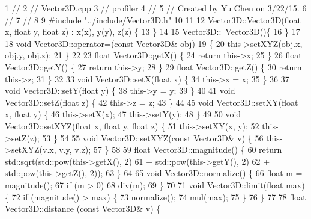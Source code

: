\begin{DoxyCodeInclude}
1 \textcolor{comment}{//}
2 \textcolor{comment}{//  Vector3D.cpp}
3 \textcolor{comment}{//  profiler}
4 \textcolor{comment}{//}
5 \textcolor{comment}{//  Created by Yu Chen on 3/22/15.}
6 \textcolor{comment}{//}
7 \textcolor{comment}{//}
8 
9 \textcolor{preprocessor}{#include "../include/Vector3D.h"}
10 
11 
12 Vector3D::Vector3D(\textcolor{keywordtype}{float} x, \textcolor{keywordtype}{float} y, \textcolor{keywordtype}{float} z) : x(x), y(y), z(z) \{
13 \}
14 
15 Vector3D::~Vector3D()\{
16 \}
17 
18 \textcolor{keywordtype}{void} Vector3D::operator=(\textcolor{keyword}{const} Vector3D& obj)
19 \{
20     this->setXYZ(obj.x, obj.y, obj.z);
21 \}
22 
23 \textcolor{keywordtype}{float} Vector3D::getX() \{
24     \textcolor{keywordflow}{return} this->x;
25 \}
26 \textcolor{keywordtype}{float} Vector3D::getY() \{
27     \textcolor{keywordflow}{return} this->y;
28 \}
29 \textcolor{keywordtype}{float} Vector3D::getZ() \{
30     \textcolor{keywordflow}{return} this->z;
31 \}
32 
33 \textcolor{keywordtype}{void} Vector3D::setX(\textcolor{keywordtype}{float} x) \{
34     this->x = x;
35 \}
36 
37 \textcolor{keywordtype}{void} Vector3D::setY(\textcolor{keywordtype}{float} y) \{
38     this->y = y;
39 \}
40 
41 \textcolor{keywordtype}{void} Vector3D::setZ(\textcolor{keywordtype}{float} z) \{
42     this->z = z;
43 \}
44 
45 \textcolor{keywordtype}{void} Vector3D::setXY(\textcolor{keywordtype}{float} x, \textcolor{keywordtype}{float} y) \{
46     this->setX(x);
47     this->setY(y);
48 \}
49 
50 \textcolor{keywordtype}{void} Vector3D::setXYZ(\textcolor{keywordtype}{float} x, \textcolor{keywordtype}{float} y, \textcolor{keywordtype}{float} z) \{
51     this->setXY(x, y);
52     this->setZ(z);
53 \}
54 
55 \textcolor{keywordtype}{void} Vector3D::setXYZ(\textcolor{keyword}{const} Vector3D& v) \{
56     this->setXYZ(v.x, v.y, v.z);
57 \}
58 
59 \textcolor{keywordtype}{float} Vector3D::magnitude() \{
60     \textcolor{keywordflow}{return} std::sqrt(std::pow(this->getX(), 2)
61                       + std::pow(this->getY(), 2)
62                       + std::pow(this->getZ(), 2));
63 \}
64 
65 \textcolor{keywordtype}{void} Vector3D::normalize() \{
66     \textcolor{keywordtype}{float} m = magnitude();
67     \textcolor{keywordflow}{if} (m > 0)
68         div(m);
69 \}
70 
71 \textcolor{keywordtype}{void} Vector3D::limit(\textcolor{keywordtype}{float} max) \{
72     \textcolor{keywordflow}{if} (magnitude() > max) \{
73         normalize();
74         mul(max);
75     \}
76 \}
77 
78 \textcolor{keywordtype}{float} Vector3D::distance (\textcolor{keyword}{const} Vector3D& v) \{

\end{DoxyCodeInclude}
